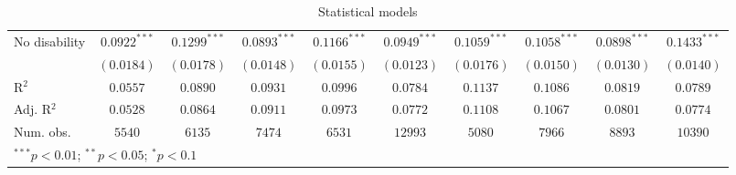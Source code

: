 \begin{table}
\begin{center}
\begin{tabular}{l c c c c c c c c c}
No disability                  & $0.0922^{***}$  & $0.1299^{***}$  & $0.0893^{***}$  & $0.1166^{***}$  & $0.0949^{***}$  & $0.1059^{***}$  & $0.1058^{***}$  & $0.0898^{***}$  & $0.1433^{***}$  \\
                               & $(0.0184)$      & $(0.0178)$      & $(0.0148)$      & $(0.0155)$      & $(0.0123)$      & $(0.0176)$      & $(0.0150)$      & $(0.0130)$      & $(0.0140)$      \\
\hline
R$^2$                          & $0.0557$        & $0.0890$        & $0.0931$        & $0.0996$        & $0.0784$        & $0.1137$        & $0.1086$        & $0.0819$        & $0.0789$        \\
Adj. R$^2$                     & $0.0528$        & $0.0864$        & $0.0911$        & $0.0973$        & $0.0772$        & $0.1108$        & $0.1067$        & $0.0801$        & $0.0774$        \\
Num. obs.                      & $5540$          & $6135$          & $7474$          & $6531$          & $12993$         & $5080$          & $7966$          & $8893$          & $10390$         \\
\hline
\multicolumn{10}{l}{\scriptsize{$^{***}p<0.01$; $^{**}p<0.05$; $^{*}p<0.1$}}
\end{tabular}
\caption{Statistical models}
\label{table:coefficients}
\end{center}
\end{table}
